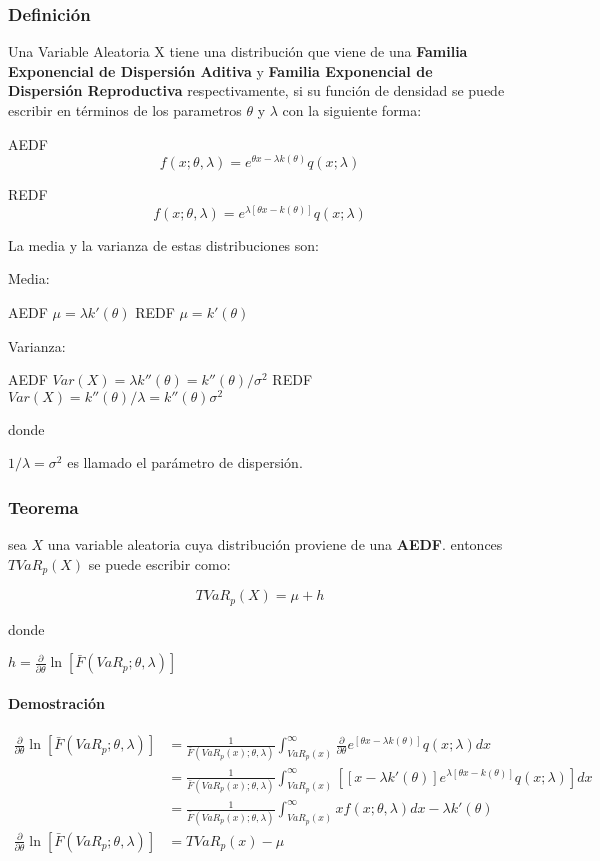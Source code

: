 \documentclass[]{article}
\begin{document}
\hypertarget{definicion}{%
\subsubsection{Definición}\label{definicion}}

Una Variable Aleatoria X tiene una distribución que viene de una
\textbf{Familia Exponencial de Dispersión Aditiva} y \textbf{Familia
Exponencial de Dispersión Reproductiva} respectivamente, si su función
de densidad se puede escribir en términos de los parametros \(\theta\) y
\(\lambda\) con la siguiente forma:

AEDF \[f(x;\theta, \lambda)=e^{\theta x-\lambda k(\theta)}q(x;\lambda)\]

REDF
\[f(x;\theta, \lambda)=e^{\lambda[\theta x- k(\theta)]}q(x;\lambda)\]

La media y la varianza de estas distribuciones son:

Media:

AEDF \(\mu = \lambda k'(\theta)\) REDF \(\mu=k'(\theta)\)

Varianza:

AEDF \(Var(X) = \lambda k''(\theta)=k''(\theta)/\sigma^2\) REDF
\(Var(X) = k''(\theta)/\lambda=k''(\theta)\sigma^2\)

donde

\(1/\lambda = \sigma^2\) es llamado el parámetro de dispersión.

\hypertarget{teorema-1}{%
\subsubsection{Teorema}\label{teorema-1}}

sea \(X\) una variable aleatoria cuya distribución proviene de una
\textbf{AEDF}. entonces \(TVaR_p(X)\) se puede escribir como:

\[TVaR_p(X)=\mu + h\]

donde

\(h=\frac{\partial}{\partial \theta}\ln[\bar{F}(VaR_p;\theta,\lambda)]\)

\hypertarget{demostracion-1}{%
\paragraph{Demostración}\label{demostracion-1}}

\[\begin{array}{rl}
\frac{\partial}{\partial \theta}\ln[\bar{F}(VaR_p;\theta,\lambda)] &\displaystyle= \frac{1}{\bar{F}(VaR_p(x);\theta,\lambda)} \int_{VaR_p(x)}^{\infty} \frac{\partial}{\partial \theta}e^{[\theta x - \lambda k(\theta)]}q(x;\lambda)dx\\
&\displaystyle= \frac{1}{\bar{F}(VaR_p(x);\theta,\lambda)} \int_{VaR_p(x)}^{\infty} \left[[x- \lambda k'(\theta)]e^{\lambda[\theta x - k(\theta)]}q(x;\lambda)\right]dx\\
&\displaystyle= \frac{1}{\bar{F}(VaR_p(x);\theta,\lambda)} \int_{VaR_p(x)}^{\infty} xf(x;\theta,\lambda)dx - \lambda k'(\theta)\\
\frac{\partial}{\partial \theta}\ln[\bar{F}(VaR_p;\theta,\lambda)] &\displaystyle= TVaR_p(x) - \mu
\end{array}\]
\end{document}
